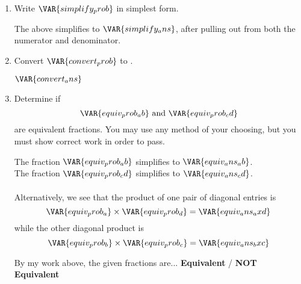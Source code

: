 
\begin{enumerate}
    \item Write $\VAR{simplify_prob}$ in simplest form.

    \vfill
    \begin{ansenv}
        The above simplifies to $\VAR{simplify_ans}$, after pulling out  from both the numerator and denominator.
    \end{ansenv}
    \vfill

    \item Convert $\VAR{convert_prob}$ to .

    \vfill
    \begin{ansenv}
        $\VAR{convert_ans}$
    \end{ansenv}
    \vfill

    \item Determine if \[\VAR{equiv_prob_ab} \text{  and  } \VAR{equiv_prob_cd}\] are equivalent fractions. You may use any method of your choosing, but you must show correct work in order to pass.

    \vfill
    \begin{ansenv}
            The fraction $\VAR{equiv_prob_ab}$ simplifies to $\VAR{equiv_ans_ab}$.\\

            The fraction $\VAR{equiv_prob_cd}$ simplifies to $\VAR{equiv_ans_cd}$.\\

            \\
            Alternatively, we see that the product of one pair of diagonal entries is \[\VAR{equiv_prob_a} \times \VAR{equiv_prob_d} = \VAR{equiv_ans_axd}\] while the other diagonal product is \[\VAR{equiv_prob_b} \times \VAR{equiv_prob_c} = \VAR{equiv_ans_bxc}\] 
    \end{ansenv}
    \vfill
    \vfill

    By my work above, the given fractions are... \hfill \textbf{%
            {}{Equivalent}%
    }
    \hspace{5pt} / \hspace{5pt}
    \textbf{%
            {}{NOT Equivalent}%
    }
    \vspace{30pt}

\end{enumerate}

\trueemptypage